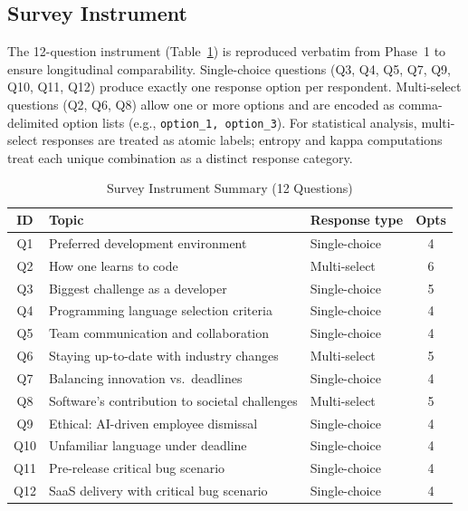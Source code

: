 \documentclass[12pt,a4paper]{article}
\begin{document}
\subsection{Survey Instrument}
\label{sec:method:survey}

The 12-question instrument (Table~\ref{tab:questions}) is reproduced
verbatim from Phase~1 to ensure longitudinal comparability.
Single-choice questions (Q3, Q4, Q5, Q7, Q9, Q10, Q11, Q12) produce
exactly one response option per respondent.
Multi-select questions (Q2, Q6, Q8) allow one or more options and
are encoded as comma-delimited option lists (e.g.,
\texttt{option\_1,~option\_3}).
For statistical analysis, multi-select responses are treated as atomic
labels; entropy and kappa computations treat each unique combination
as a distinct response category.

\begin{table}[ht]
\caption{Survey Instrument Summary (12 Questions)}
\label{tab:questions}
\centering\small
\setlength{\tabcolsep}{4pt}
\begin{tabular}{cllc}
\toprule
\textbf{ID} & \textbf{Topic} & \textbf{Response type} & \textbf{Opts} \\
\midrule
Q1  & Preferred development environment         & Single-choice  & 4 \\
Q2  & How one learns to code                    & Multi-select   & 6 \\
Q3  & Biggest challenge as a developer          & Single-choice  & 5 \\
Q4  & Programming language selection criteria   & Single-choice  & 4 \\
Q5  & Team communication and collaboration      & Single-choice  & 4 \\
Q6  & Staying up-to-date with industry changes  & Multi-select   & 5 \\
Q7  & Balancing innovation vs.\ deadlines       & Single-choice  & 4 \\
Q8  & Software's contribution to societal challenges & Multi-select & 5 \\
Q9  & Ethical: AI-driven employee dismissal     & Single-choice  & 4 \\
Q10 & Unfamiliar language under deadline        & Single-choice  & 4 \\
Q11 & Pre-release critical bug scenario         & Single-choice  & 4 \\
Q12 & SaaS delivery with critical bug scenario  & Single-choice  & 4 \\
\bottomrule
\end{tabular}
\end{table}
\end{document}
